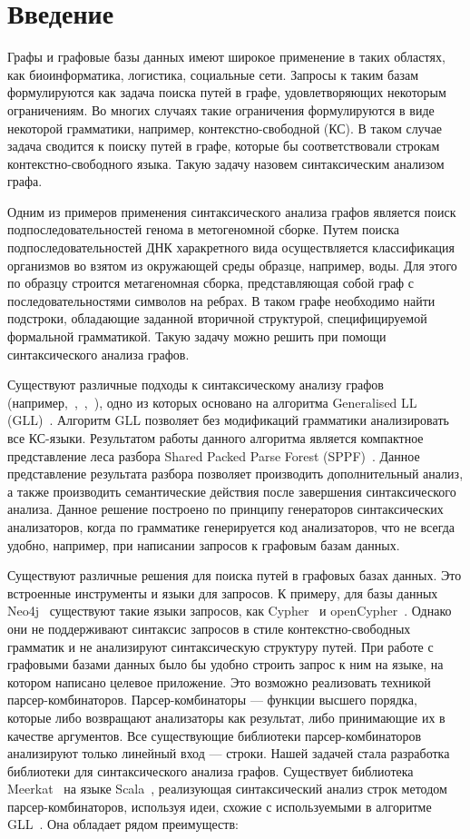 \section*{Введение}
Графы и графовые базы данных имеют широкое применение в таких областях, как биоинформатика, логистика, социальные сети. Запросы к таким базам формулируются как задача поиска путей в графе, удовлетворяющих некоторым ограничениям. Во многих случаях такие ограничения формулируются в виде некоторой грамматики, например, контекстно-свободной (КС). В таком случае задача сводится к поиску путей в графе, которые бы соответствовали строкам контекстно-свободного языка. Такую задачу назовем синтаксическим анализом графа. 

Одним из примеров применения синтаксического анализа графов является поиск подпоследовательностей генома в метогеномной сборке. Путем поиска подпоследовательностей ДНК харакретного вида осуществляется классификация организмов во взятом из окружающей среды образце, например, воды. Для этого по образцу строится метагеномная сборка, представляющая собой граф с последовательностями символов на ребрах. В таком графе необходимо найти подстроки, обладающие заданной вторичной структурой, специфицируемой формальной грамматикой. Такую задачу можно решить при помощи синтаксического анализа графов.

Существуют различные подходы к синтаксическому анализу графов (например,~\cite{GrigRagCFPQuerying},~\cite{Hellings},~\cite{Sevon}), одно из которых основано на алгоритма Generalised LL (GLL)~\cite{GrigRagCFPQuerying}. Алгоритм GLL позволяет без модификаций грамматики анализировать все КС-языки. Результатом работы данного алгоритма является компактное представление леса разбора Shared Packed Parse Forest (SPPF)~\cite{SPPF}. Данное представление результата разбора позволяет производить дополнительный анализ, а также производить семантические действия после завершения синтаксического анализа. Данное решение построено по принципу генераторов синтаксических анализаторов, когда по грамматике генерируется код анализаторов, что не всегда удобно, например, при написании запросов к графовым базам данных.

Существуют различные решения для поиска путей в графовых базах данных. Это встроенные инструменты и языки для запросов. К примеру, для базы данных Neo4j~\cite{Neo4j} существуют такие языки запросов, как Cypher~\cite{Cypher} и openCypher~\cite{openCypher}. Однако они не поддерживают синтаксис запросов в стиле контекстно-свободных грамматик и не анализируют синтаксическую структуру путей. При работе с графовыми базами данных было бы удобно строить запрос к ним на языке, на котором написано целевое приложение. Это возможно реализовать техникой парсер-комбинаторов. Парсер-комбинаторы --- функции высшего порядка, которые либо возвращают анализаторы как результат, либо принимающие их в качестве аргументов. Все существующие библиотеки парсер-комбинаторов анализируют только линейный вход --- строки. Нашей задачей стала разработка библиотеки для синтаксического анализа графов. Существует библиотека Meerkat~\cite{Meerkat} на языке Scala~\cite{Scala}, реализующая синтаксический анализ строк методом парсер-комбинаторов, используя идеи, схожие с используемыми в алгоритме GLL~\cite{GLL}. Она обладает рядом преимуществ:

